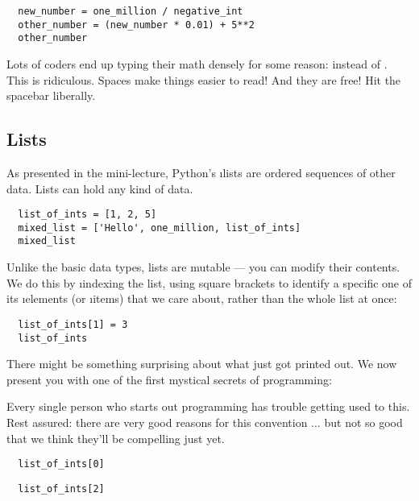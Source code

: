 \documentclass[letterpaper, 12pt, titlepage, twoside]{article}
\begin{document}
\begin{lstlisting}
  new_number = one_million / negative_int
  other_number = (new_number * 0.01) + 5**2
  other_number
\end{lstlisting}

Lots of coders end up typing their math densely for some reason: 
instead of . This is ridiculous. Spaces make things easier to
read! And they are free! Hit the spacebar liberally.

\subsection*{Lists}

As presented in the mini-lecture, Python's \i{lists} are ordered sequences of
other data. Lists can hold any kind of data.

\begin{lstlisting}
  list_of_ints = [1, 2, 5]
  mixed_list = ['Hello', one_million, list_of_ints]
  mixed_list
\end{lstlisting}

Unlike the basic data types, lists are mutable --- you can modify their
contents. We do this by \i{indexing} the list, using square brackets to
identify a specific one of its \i{elements} (or \i{items}) that we care about,
rather than the whole list at once:

\begin{lstlisting}
  list_of_ints[1] = 3
  list_of_ints
\end{lstlisting}

There might be something surprising about what just got printed out. We now
present you with one of the first mystical secrets of programming:

\medskip
\begin{center}
\end{center}
\medskip

Every single person who starts out programming has trouble getting used to
this. Rest assured: there are very good reasons for this convention $\ldots$
but not so good that we think they'll be compelling just yet.

\begin{lstlisting}
  list_of_ints[0]
\end{lstlisting}

\begin{lstlisting}
  list_of_ints[2]
\end{lstlisting}
\end{document}
